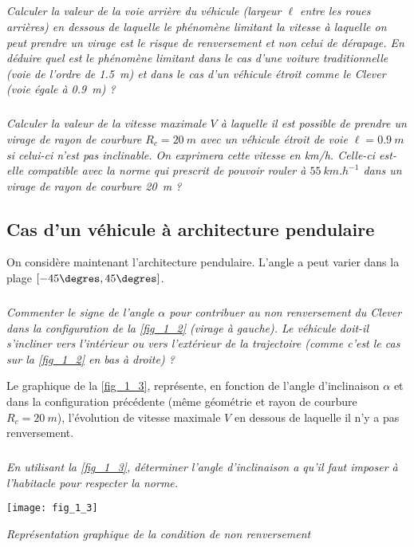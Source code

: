 \begin{multicols}{2}
\subparagraph{}\textit{Calculer la valeur de la voie arrière du véhicule (largeur $\ell$ entre les roues arrières) en dessous de laquelle le phénomène limitant la vitesse à laquelle on peut prendre un virage est le risque de renversement et non celui de dérapage. En déduire quel est le phénomène limitant dans le cas d'une voiture traditionnelle (voie de l'ordre de \SI{1,5}{m}) et dans le cas d'un véhicule étroit comme le Clever (voie égale à \SI{0,9}{m}) ?}
\ifprof
\begin{corrige}
\end{corrige}
\else
\fi



\subparagraph{}\textit{Calculer la valeur de la vitesse maximale $V$ à laquelle il est possible de prendre un virage de rayon de courbure $R_c = \SI{20}{m}$ avec un véhicule étroit de voie $\ell = \SI{0,9}{m}$ si celui-ci n'est pas inclinable. On exprimera cette vitesse en km/h. Celle-ci est-elle compatible avec la norme qui prescrit de pouvoir rouler à $\SI{55}{km.h^{-1}}$ dans un virage de rayon de courbure \SI{20}{m} ?}
\ifprof
\begin{corrige}
\end{corrige}
\else
\fi


\subsection{Cas d'un véhicule à architecture pendulaire}

On considère maintenant l'architecture pendulaire. L'angle a peut varier dans la plage $[- 45\degres, 45\degres]$.

\subparagraph{}\textit{Commenter le signe de l'angle $\alpha$ pour contribuer au non renversement du Clever dans la configuration de la 
\autoref{fig_1_2} (virage à gauche). Le véhicule doit-il s'incliner vers l'intérieur ou vers l'extérieur de la trajectoire (comme c'est le cas sur la \autoref{fig_1_2} en bas à droite) ? }
\ifprof
\begin{corrige}
\end{corrige}
\else
\fi

Le graphique de la \autoref{fig_1_3}, représente, en fonction de l'angle d'inclinaison $\alpha$ et dans la configuration précédente (même géométrie et rayon de courbure $R_c = \SI{20}{m}$), l'évolution de vitesse maximale $V$ en dessous de laquelle il n'y a pas renversement.



\subparagraph{}\textit{En utilisant la \autoref{fig_1_3}, déterminer l'angle d'inclinaison a qu'il faut imposer à l'habitacle pour respecter la norme. }
\ifprof
\begin{corrige}
\end{corrige}
\else
\fi

\begin{center}%
\centering
\texttt{[image: fig\_1\_3]}

\textit{Représentation graphique de la condition de non renversement}
\label{fig_1_3}
\end{center}


\ifprof
\else
\end{multicols}%
\fi

